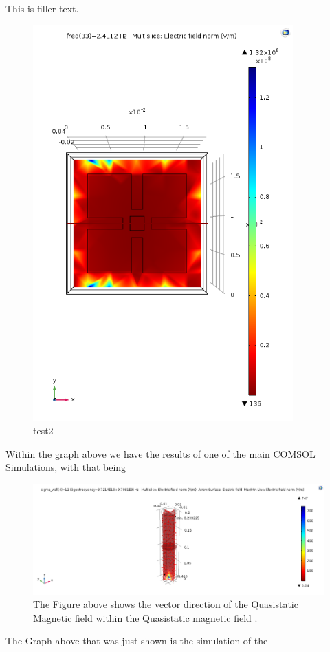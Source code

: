 \documentclass[]{article}
\begin{document}
\noindent
This is filler text.
\begin{figure}[H]
	\centering
	\includegraphics[width=10cm, height=10 cm]{ElectricFieldNormalGraphImage.png}
	\caption{test2}
	\label{test2121}
\end{figure}
\noindent
Within the graph above we have the results of one of the main COMSOL Simulations, with that being 
\begin{figure}[H]
	\centering
	\includegraphics[width=\textwidth]{QuasistaticMagneticFieldVectorDirectionGraphImages.png}
	\caption{The Figure above shows the vector direction of the Quasistatic Magnetic field within the Quasistatic magnetic field .}
	\label{test982}
\end{figure}
\noindent
The Graph above that was just shown is the simulation of the 
\end{document}
